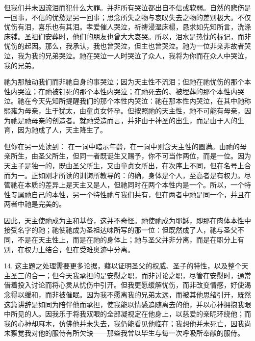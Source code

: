 但我们并未因流泪而犯什么大罪。并非所有哭泣都出自不信或软弱。自然的悲伤是一回事，不信的忧愁是另一回事；思念所失之物与哀叹失去之物的差别极大。不仅忧伤有泪，喜乐也有其泪。孝爱催人哭泣，祈祷浸湿床榻，恳求如先知所言，洗涤床铺。圣祖们安葬时，他们的朋友也曾大大哀哭。所以，泪水是热忱的标记，而非忧伤的起因。那么，我承认，我也曾哭泣，但主也曾哭泣。祂为一位非亲非故者哭泣，我为我的兄弟哭泣。祂在哭泣一人时哭泣了众人，我将为你而在众人中哭泣，我的兄弟。\par

祂为那触动我们而非祂自身的事哭泣；因为天主性不流泪；但祂在祂忧伤的那个本性内哭泣；在祂被钉死的那个本性内哭泣；在祂死去的、被埋葬的那个本性内哭泣。祂在今天先知所提醒我们的那个本性内哭泣：祂在那本性内哭泣，在其中祂称熙雍为母亲，生于犹太，由童贞女怀孕。但按照祂的天主性，祂不可能有母亲，因为祂是祂母亲的创造者。就祂受造而言，并非由于神圣的出生，而是由于人的生育，因为祂成了人，天主降生了。\par

但你在另一处读到： 在一词中暗示年龄，在一词中则含天主性的圆满。由祂的母亲所生，由圣父所生，但同一者既诞生又赐予，你不可当作两位，而是一位。因为天主子是独一的，既由圣父所生，又由童贞女所出，在次序上不同，但在名号上合而为一。正如刚才所读的训诲所教导的：的确，身体是个人，至高者是有权力。尽管祂在本质的差异上是天主又是人，但祂同时在两个本性内是一个。所以，一个特性专属祂自己的本性，另一个特性祂与我们共有，但在两者中祂是同一个，并且在两者中祂是完美的。\par

因此，天主使祂成为主和基督，这并不奇怪。祂使祂成为耶稣，即那在肉体本性中接受名字的祂；祂使祂成为圣祖达味所写的那一位：但既然成了人，祂与圣父不同，不是在天主性上，而是在祂的身体上；祂与圣父并非分离，而是在职分上有别，在权力上结合，但在受难奥迹中分离。\par

14. 这主题之处理需要更多论据，藉以证明圣父的权威、圣子的特性，以及整个天主圣三的合一；但今天我承担的是安慰之职，而非讨论之职，尽管在安慰时，通常借着投入讨论而将心灵从忧伤中引开。但我更愿缓解忧伤，而非改变情感，好使渴念得以缓和，而非被催眠。因为我不愿离我的兄弟太远，而被其他思绪引开，既然这篇讲辞是如同为陪伴他而承担，使我能以情感追随离去的他，并以心神拥抱我眼中所见的人。因我乐于将我双眼的全部凝视定在他身上，以慈爱的亲昵环绕他；而我的心神却麻木，仿佛他并未失去，我仍能看见他临在；我想他并未死亡，因我尚未察觉我对他的服侍有所欠缺——那些我曾以毕生与每一次呼吸所奉献的服侍。\par

